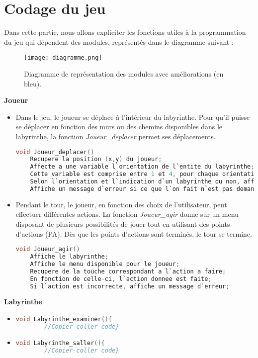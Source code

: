 \documentclass[a4paper,11pt]{report}
\begin{document}
  \chapter{Codage du jeu}
  Dans cette partie, nous allons expliciter les fonctions utiles à la programmation du jeu qui dépendent des modules, représentés dans le diagramme suivant :
    \begin{figure}[htbp]
      \center
      \texttt{[image: diagramme.png]}
      \caption{Diagramme de représentation des modules avec améliorations (en bleu).}
    \end{figure}
  \newpage
  	\textbf{Joueur}
  		\begin{itemize}
    		\item 
    Dans le jeu, le joueur se déplace à l'intérieur du labyrinthe. Pour qu'il puisse se déplacer en fonction des murs ou des chemins disponibles dans le labyrinthe, la fonction \textit{Joueur\_deplacer} permet ses déplacements. 
		\begin{lstlisting}[language=c] 
void Joueur_deplacer()
    Recupere la position (x,y) du joueur;
    Affecte a une variable l`orientation de l`entite du labyrinthe;
    Cette variable est comprise entre 1 et 4, pour chaque orientation possible;
    Selon l`orientation et l`indication d`un labyrinthe ou non, affiche les disponibilites pour se deplacer;
    Affiche un message d`erreur si ce que l`on fait n`est pas demande
         \end{lstlisting}
          
    		\item Pendant le tour, le joueur, en fonction des choix de l'utilisateur, peut effectuer différentes actions. La fonction \textit{Joueur\_agir} donne sur un menu disposant de plusieurs possibilités de jouer tout en utilisant des points d'actions (PA). Dès que les points d'actions sont terminés, le tour se termine.
    	\begin{lstlisting}[language=c]
void Joueur_agir()
    Affiche le labyrinthe;
    Affiche le menu disponible pour le joueur;
    Recupere de la touche correspondant a l`action a faire;
    En fonction de celle-ci, l`action donnee est faite;
    Si l`action est incorrecte, affiche un message d`erreur;
        \end{lstlisting}
  		\end{itemize}

   \textbf{Labyrinthe}
    	\begin{itemize}
      		\item 
      		\begin{lstlisting}[language=c] 
void Labyrinthe_examiner(){
      	//Copier-coller code}
            	  \end{lstlisting}
          
      		\item 
      		\begin{lstlisting}[language=c] 
void Labyrinthe_saller(){
        //Copier-coller code}
            	  \end{lstlisting}
  		\end{itemize}
  		
\end{document}
